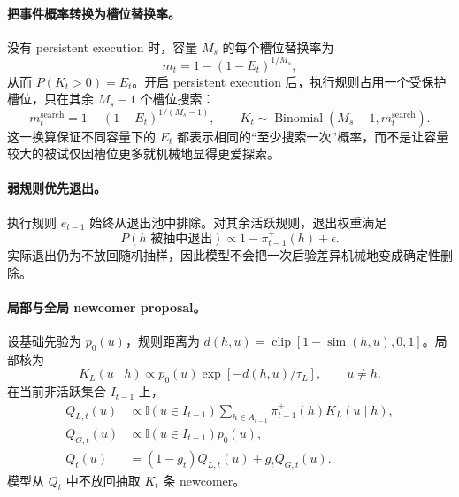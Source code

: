 \paragraph{把事件概率转换为槽位替换率。}
没有 persistent execution 时，容量 $M_s$ 的每个槽位替换率为
\begin{equation}
m_t=1-(1-E_t)^{1/M_s},
\label{eq:model0811-event-to-slot}
\end{equation}
从而 $P(K_t>0)=E_t$。开启 persistent execution 后，执行规则占用一个受保护槽位，只在其余 $M_s-1$ 个槽位搜索：
\begin{equation}
m_t^{\mathrm{search}}
=1-(1-E_t)^{1/(M_s-1)},
\qquad
K_t\sim\operatorname{Binomial}(M_s-1,m_t^{\mathrm{search}}).
\label{eq:model0811-protected-search}
\end{equation}
这一换算保证不同容量下的 $E_t$ 都表示相同的“至少搜索一次”概率，而不是让容量较大的被试仅因槽位更多就机械地显得更爱探索。

\paragraph{弱规则优先退出。}
执行规则 $e_{t-1}$ 始终从退出池中排除。对其余活跃规则，退出权重满足
\begin{equation}
P(h\text{ 被抽中退出})
\propto 1-\pi^+_{t-1}(h)+\epsilon.
\label{eq:model0811-drop-rule}
\end{equation}
实际退出仍为不放回随机抽样，因此模型不会把一次后验差异机械地变成确定性删除。

\paragraph{局部与全局 newcomer proposal。}
设基础先验为 $p_0(u)$，规则距离为
$d(h,u)=\operatorname{clip}[1-\operatorname{sim}(h,u),0,1]$。局部核为
\begin{equation}
K_L(u\mid h)
\propto p_0(u)\exp[-d(h,u)/\tau_L],
\qquad u\ne h.
\label{eq:model0811-local-kernel}
\end{equation}
在当前非活跃集合 $I_{t-1}$ 上，
\begin{align}
Q_{L,t}(u)
&\propto
\mathbb I(u\in I_{t-1})
\sum_{h\in A_{t-1}}\pi^+_{t-1}(h)K_L(u\mid h),
\nonumber\\
Q_{G,t}(u)
&\propto\mathbb I(u\in I_{t-1})p_0(u),
\nonumber\\
Q_t(u)
&=(1-g_t)Q_{L,t}(u)+g_tQ_{G,t}(u).
\label{eq:model0811-newcomer-proposal}
\end{align}
模型从 $Q_t$ 中不放回抽取 $K_t$ 条 newcomer。

